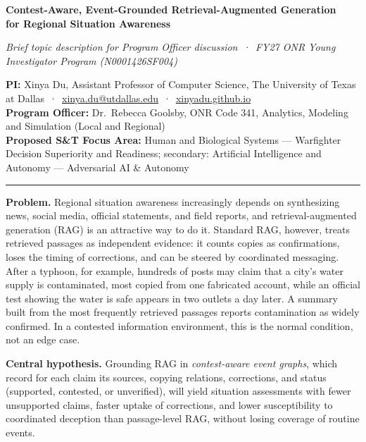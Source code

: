 \documentclass[11pt]{article}
\newcommand{\head}[1]{{\color{navy}\textbf{#1}}\enspace}
\newcommand{\POline}{Dr.\ Rebecca Goolsby, ONR Code 341, Analytics, Modeling and Simulation (Local and Regional)}
\newcommand{\FocusArea}{Human and Biological Systems --- Warfighter Decision Superiority and Readiness; secondary: Artificial Intelligence and Autonomy --- Adversarial AI \& Autonomy}
\begin{document}
\begin{center}
{\fontsize{15.5}{18.5}\selectfont\bfseries\color{navy} Contest-Aware, Event-Grounded Retrieval-Augmented Generation\\[1pt] for Regional Situation Awareness\par}
\vspace{3pt}
{\small\itshape Brief topic description for Program Officer discussion \,·\, FY27 ONR Young Investigator Program (N0001426SF004)\par}
\end{center}
\vspace{-2pt}
{\small
\textbf{PI:} Xinya Du, Assistant Professor of Computer Science, The University of Texas at Dallas \,·\, \href{mailto:xinya.du@utdallas.edu}{xinya.du@utdallas.edu} \,·\, \href{https://xinyadu.github.io}{xinyadu.github.io}\\
\textbf{Program Officer:} \POline\\
\textbf{Proposed S\&T Focus Area:} \FocusArea\par}
\vspace{-3pt}
{\color{navy}\rule{\linewidth}{0.6pt}}

\head{Problem.} Regional situation awareness increasingly depends on synthesizing news, social media, official statements, and field reports, and retrieval-augmented generation (RAG) is an attractive way to do it. Standard RAG, however, treats retrieved passages as independent evidence: it counts copies as confirmations, loses the timing of corrections, and can be steered by coordinated messaging. After a typhoon, for example, hundreds of posts may claim that a city's water supply is contaminated, most copied from one fabricated account, while an official test showing the water is safe appears in two outlets a day later. A summary built from the most frequently retrieved passages reports contamination as widely confirmed. In a contested information environment, this is the normal condition, not an edge case.

\head{Central hypothesis.} Grounding RAG in \emph{contest-aware event graphs}, which record for each claim its sources, copying relations, corrections, and status (supported, contested, or unverified), will yield situation assessments with fewer unsupported claims, faster uptake of corrections, and lower susceptibility to coordinated deception than passage-level RAG, without losing coverage of routine events.
\end{document}
